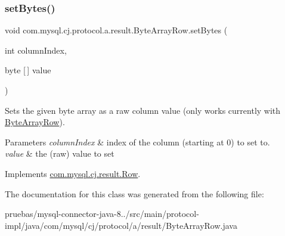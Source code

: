\subsubsection{\texorpdfstring{set\+Bytes()}{setBytes()}}
{\footnotesize\ttfamily void com.\+mysql.\+cj.\+protocol.\+a.\+result.\+Byte\+Array\+Row.\+set\+Bytes (\begin{DoxyParamCaption}\item[{int}]{column\+Index,  }\item[{byte \mbox{[}$\,$\mbox{]}}]{value }\end{DoxyParamCaption})}

Sets the given byte array as a raw column value (only works currently with \mbox{\hyperlink{classcom_1_1mysql_1_1cj_1_1protocol_1_1a_1_1result_1_1_byte_array_row}{Byte\+Array\+Row}}).


\begin{DoxyParams}{Parameters}
{\em column\+Index} & index of the column (starting at 0) to set to. \\
\hline
{\em value} & the (raw) value to set \\
\hline
\end{DoxyParams}


Implements \mbox{\hyperlink{interfacecom_1_1mysql_1_1cj_1_1result_1_1_row_aaa1223e3df4e0f2b1b383d86095e7789}{com.\+mysql.\+cj.\+result.\+Row}}.



The documentation for this class was generated from the following file\+:\begin{DoxyCompactItemize}
\item 
pruebas/mysql-\/connector-\/java-\/8../src/main/protocol-\/impl/java/com/mysql/cj/protocol/a/result/Byte\+Array\+Row.\+java\end{DoxyCompactItemize}
